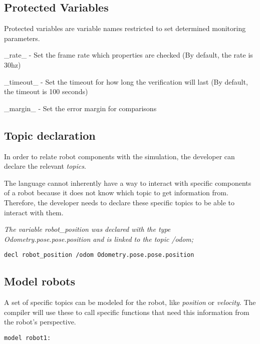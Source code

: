 \subsection{Protected Variables}
\label{ssec:protectedvariables}

Protected variables are variable names restricted to set determined monitoring parameters.

\_rate\_ - Set the frame rate which properties are checked (By default, the rate is 30hz)

\_timeout\_ - Set the timeout for how long the verification will last (By default, the timeout is 100 seconds)

\_margin\_ - Set the error margin for comparisons


\subsection{Topic declaration}
\label{ssec:declarations}

In order to relate robot components with the simulation, the developer can declare the relevant \textit{topics}.

The language cannot inherently have a way to interact with specific components of a robot because it does not know which topic to get information from. Therefore, the developer needs to declare these specific topics to be able to interact with them.

\textit{The variable robot\_position was declared with the type Odometry.pose.pose.position and is linked to the topic /odom;}

\texttt{decl robot\_position /odom Odometry.pose.pose.position}


\subsection{Model robots}
\label{ssec:models}

A set of specific topics can be modeled for the robot, like \textit{position} or \textit{velocity}. The compiler will use these to call specific functions that need this information from the robot's perspective.

\texttt{model robot1:}

